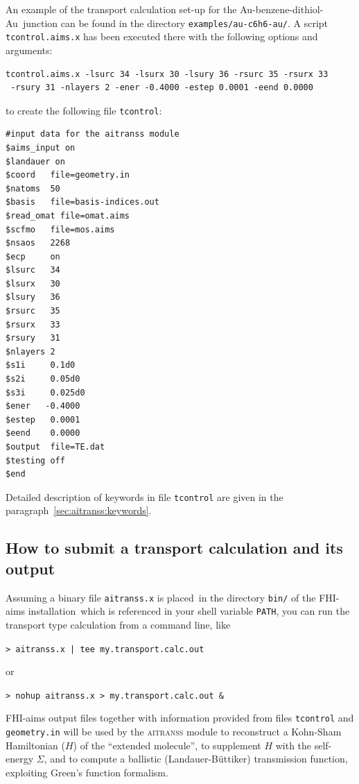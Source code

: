 An example of the transport calculation set-up for the
Au-benzene-dithiol-Au\ junction can be found in the directory
\texttt{examples/au-c6h6-au/}.  A script \texttt{tcontrol.aims.x} has
been executed there with the following options and arguments:

\begin{verbatim} 
tcontrol.aims.x -lsurc 34 -lsurx 30 -lsury 36 -rsurc 35 -rsurx 33
 -rsury 31 -nlayers 2 -ener -0.4000 -estep 0.0001 -eend 0.0000
\end{verbatim}

to create the following file \verb,tcontrol,:

\begin{verbatim}
#input data for the aitranss module
$aims_input on
$landauer on
$coord   file=geometry.in
$natoms  50
$basis   file=basis-indices.out
$read_omat file=omat.aims
$scfmo   file=mos.aims
$nsaos   2268
$ecp     on
$lsurc   34
$lsurx   30
$lsury   36
$rsurc   35
$rsurx   33
$rsury   31
$nlayers 2
$s1i     0.1d0
$s2i     0.05d0
$s3i     0.025d0
$ener   -0.4000
$estep   0.0001
$eend    0.0000
$output  file=TE.dat
$testing off
$end
\end{verbatim}

Detailed description of keywords in file  \verb,tcontrol, are given in
the paragraph~\ref{sec:aitranss:keywords}.

\subsection{%
How to submit a transport calculation and its output} 
\label{subsec:aitranss:calc}

Assuming a binary file \verb,aitranss.x, is placed\ in the directory
\verb,bin/, of the FHI-aims installation\ which is referenced in your
shell variable \verb,PATH,, you can run the transport type calculation
from a command line, like

\verb,> aitranss.x | tee my.transport.calc.out,

or

\verb,> nohup aitranss.x > my.transport.calc.out &,

FHI-aims output files together with information provided from files
\verb,tcontrol, and \linebreak \verb,geometry.in, will be used by the
\textsc{aitranss} module to reconstruct a Kohn-Sham Hamiltonian ($H$) of the
``extended molecule'', to supplement $H$ with the self-energy $\Sigma$,
and to compute a ballistic (Landauer-B\"uttiker) transmission function,
exploiting Green's function formalism.

